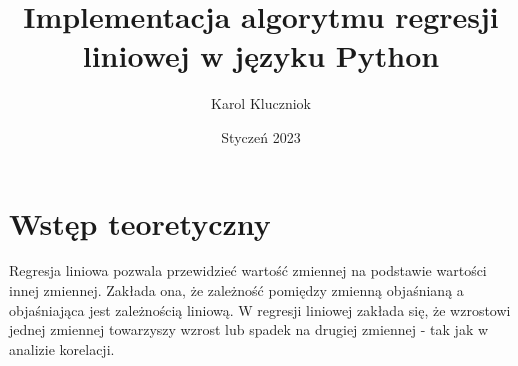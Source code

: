 \documentclass{article}
\title{Implementacja algorytmu regresji liniowej w języku Python}
\author{Karol Kluczniok}
\date{Styczeń 2023}
\begin{document}
\maketitle


\section{Wstęp teoretyczny}

Regresja liniowa pozwala przewidzieć wartość zmiennej na podstawie wartości innej zmiennej. Zakłada ona, że zależność pomiędzy zmienną objaśnianą a objaśniająca jest zależnością liniową. W regresji liniowej zakłada się, że wzrostowi jednej zmiennej towarzyszy wzrost lub spadek na drugiej zmiennej - tak jak w analizie korelacji.
\end{document}
